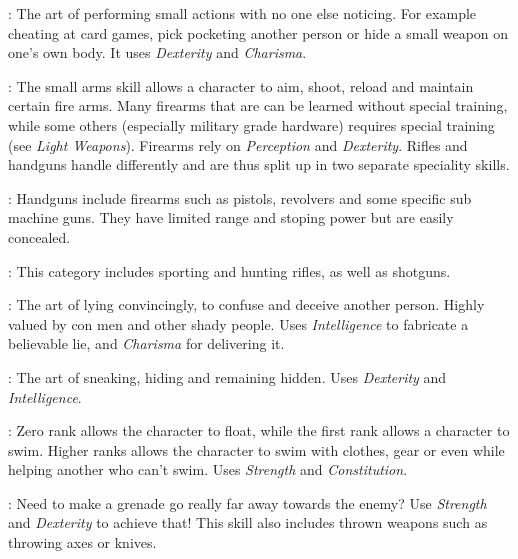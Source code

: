: The art of performing small actions with no one else
noticing. For example cheating at card games, pick pocketing another person
or hide a small weapon on one's own body. It uses \emph{Dexterity} and
\emph{Charisma}.

: The small arms skill allows a character to aim, shoot, reload
and maintain certain fire arms. Many firearms that are can be learned without
special training, while some others (especially military grade hardware)
requires special training (see \emph{Light Weapons}). Firearms rely on
\emph{Perception} and \emph{Dexterity}. Rifles and handguns handle differently
and are thus split up in two separate speciality skills.

: Handguns include firearms such as
pistols, revolvers and some specific sub machine guns. They have limited range
and stoping power but are easily concealed.

: This category includes sporting and
hunting rifles, as well as shotguns.

: The art of lying convincingly, to confuse and deceive
another person. Highly valued by con men and other shady people. Uses
\emph{Intelligence} to fabricate a believable lie, and \emph{Charisma} for
delivering it.

: The art of sneaking, hiding and remaining hidden. Uses
\emph{Dexterity} and \emph{Intelligence}.

: Zero rank allows the character to float, while the first rank
allows a character to swim. Higher ranks allows the character to swim with
clothes, gear or even while helping another who can't swim. Uses \emph{Strength}
and \emph{Constitution}.

: Need to make a grenade go really far away towards the enemy?
Use \emph{Strength} and \emph{Dexterity} to achieve that! This skill also
includes thrown weapons such as throwing axes or knives.
